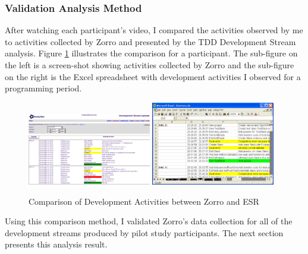 \subsubsection{Validation Analysis Method}
After watching each participant's video, I compared the activities observed 
by me to activities collected by Zorro and presented by the TDD Development 
Stream analysis. Figure \ref{fig:DataVerification} illustrates the comparison 
for a participant. The sub-figure on the left is a screen-shot showing activities
collected by Zorro and the sub-figure on the right is the Excel spreadsheet with 
development activities I observed for a programming period. 
\begin{figure}[hbtp]  
  \centering
  \includegraphics[width=0.48\textwidth]{figs/Zorro-Gui} 
  \includegraphics[width=0.48\textwidth]{figs/VideoScriptExcel}
  \caption{Comparison of Development Activities between Zorro and ESR}
\label{fig:DataVerification}
\end{figure}
Using this comparison method, I validated Zorro's data collection for
all of the development streams produced by pilot study participants. 
The next section presents this analysis result. 

